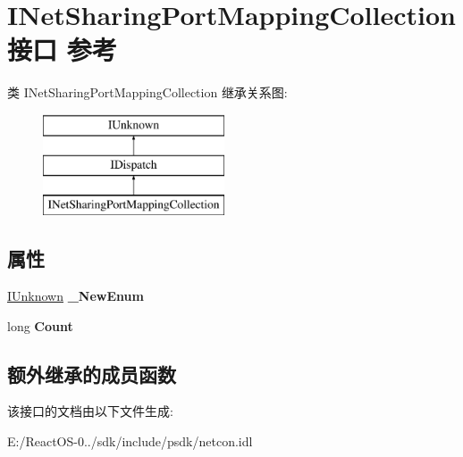 \hypertarget{interface_i_net_sharing_port_mapping_collection}{}\section{I\+Net\+Sharing\+Port\+Mapping\+Collection接口 参考}
\label{interface_i_net_sharing_port_mapping_collection}
类 I\+Net\+Sharing\+Port\+Mapping\+Collection 继承关系图\+:\begin{figure}[H]
\begin{center}
\leavevmode
\includegraphics[height=3.000000cm]{interface_i_net_sharing_port_mapping_collection}
\end{center}
\end{figure}
\subsection*{属性}
\begin{DoxyCompactItemize}
\item 
\mbox{\label{interface_i_net_sharing_port_mapping_collection_a37525dfdcf9d9a08a23d41de5b3e7907}} 
\hyperlink{interface_i_unknown}{I\+Unknown} {\bfseries \+\_\+\+New\+Enum}
\item 
\mbox{\label{interface_i_net_sharing_port_mapping_collection_a4c5cebcd4b77949f9e2a53e689029df2}} 
long {\bfseries Count}
\end{DoxyCompactItemize}
\subsection*{额外继承的成员函数}


该接口的文档由以下文件生成\+:\begin{DoxyCompactItemize}
\item 
E\+:/\+React\+O\+S-\/0../sdk/include/psdk/netcon.\+idl\end{DoxyCompactItemize}
